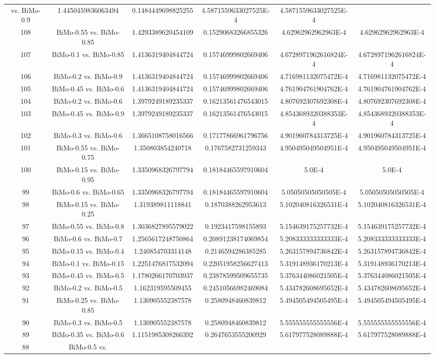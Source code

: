 \documentclass[a4paper,10pt]{article}
\begin{document}
\begin{landscape}
\begin{table}[!htp]
\begin{tabular}{cccccc}
vs. BiMo-0.9&1.4450459836063494&0.1484449698825255&4.5871559633027525E-4&4.5871559633027525E-4\\108&BiMo-0.55 vs. BiMo-0.85&1.4293389620454109&0.15290683266855326&4.62962962962963E-4&4.62962962962963E-4\\107&BiMo-0.1 vs. BiMo-0.85&1.4136319404844724&0.15746999802669406&4.6728971962616824E-4&4.6728971962616824E-4\\106&BiMo-0.2 vs. BiMo-0.9&1.4136319404844724&0.15746999802669406&4.716981132075472E-4&4.716981132075472E-4\\105&BiMo-0.45 vs. BiMo-0.6&1.4136319404844724&0.15746999802669406&4.761904761904762E-4&4.761904761904762E-4\\104&BiMo-0.2 vs. BiMo-0.6&1.3979249189235337&0.16213561476543015&4.807692307692308E-4&4.807692307692308E-4\\103&BiMo-0.45 vs. BiMo-0.9&1.3979249189235337&0.16213561476543015&4.8543689320388353E-4&4.8543689320388353E-4\\102&BiMo-0.3 vs. BiMo-0.6&1.3665108758016566&0.17177866961796756&4.901960784313725E-4&4.901960784313725E-4\\101&BiMo-0.55 vs. BiMo-0.75&1.350803854240718&0.1767582731259343&4.950495049504951E-4&4.950495049504951E-4\\100&BiMo-0.15 vs. BiMo-0.95&1.3350968326797794&0.18184465597910604&5.0E-4&5.0E-4\\99&BiMo-0.6 vs. BiMo-0.65&1.3350968326797794&0.18184465597910604&5.05050505050505E-4&5.05050505050505E-4\\98&BiMo-0.15 vs. BiMo-0.25&1.319389811118841&0.1870388262953613&5.102040816326531E-4&5.102040816326531E-4\\97&BiMo-0.55 vs. BiMo-0.8&1.3036827895579022&0.1923417598155893&5.154639175257732E-4&5.154639175257732E-4\\96&BiMo-0.6 vs. BiMo-0.7&1.2565617248750864&0.20891238174069854&5.208333333333333E-4&5.208333333333333E-4\\95&BiMo-0.15 vs. BiMo-0.4&1.240854703314148&0.2146594286385285&5.263157894736842E-4&5.263157894736842E-4\\94&BiMo-0.1 vs. BiMo-0.15&1.2251476817532094&0.22051958256627413&5.319148936170213E-4&5.319148936170213E-4\\93&BiMo-0.45 vs. BiMo-0.5&1.1780266170703937&0.23878599509655735&5.376344086021505E-4&5.376344086021505E-4\\92&BiMo-0.2 vs. BiMo-0.5&1.162319595509455&0.24510566982469084&5.434782608695652E-4&5.434782608695652E-4\\91&BiMo-0.25 vs. BiMo-0.85&1.130905552387578&0.2580948460839812&5.494505494505495E-4&5.494505494505495E-4\\90&BiMo-0.3 vs. BiMo-0.5&1.130905552387578&0.2580948460839812&5.555555555555556E-4&5.555555555555556E-4\\89&BiMo-0.35 vs. BiMo-0.6&1.1151985308266392&0.2647653555200929&5.617977528089888E-4&5.617977528089888E-4\\88&BiMo-0.5 vs. 
\end{tabular}
\end{table}
\end{landscape}
\end{document}

